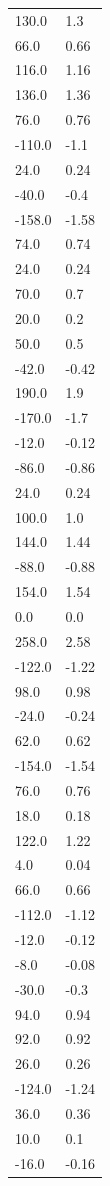 \begin{longtable}{ll}
130.0 & 1.3 \\
66.0 & 0.66 \\
116.0 & 1.16 \\
136.0 & 1.36 \\
76.0 & 0.76 \\
-110.0 & -1.1 \\
24.0 & 0.24 \\
-40.0 & -0.4 \\
-158.0 & -1.58 \\
74.0 & 0.74 \\
24.0 & 0.24 \\
70.0 & 0.7 \\
20.0 & 0.2 \\
50.0 & 0.5 \\
-42.0 & -0.42 \\
190.0 & 1.9 \\
-170.0 & -1.7 \\
-12.0 & -0.12 \\
-86.0 & -0.86 \\
24.0 & 0.24 \\
100.0 & 1.0 \\
144.0 & 1.44 \\
-88.0 & -0.88 \\
154.0 & 1.54 \\
0.0 & 0.0 \\
258.0 & 2.58 \\
-122.0 & -1.22 \\
98.0 & 0.98 \\
-24.0 & -0.24 \\
62.0 & 0.62 \\
-154.0 & -1.54 \\
76.0 & 0.76 \\
18.0 & 0.18 \\
122.0 & 1.22 \\
4.0 & 0.04 \\
66.0 & 0.66 \\
-112.0 & -1.12 \\
-12.0 & -0.12 \\
-8.0 & -0.08 \\
-30.0 & -0.3 \\
94.0 & 0.94 \\
92.0 & 0.92 \\
26.0 & 0.26 \\
-124.0 & -1.24 \\
36.0 & 0.36 \\
10.0 & 0.1 \\
-16.0 & -0.16 \\

\end{longtable}
